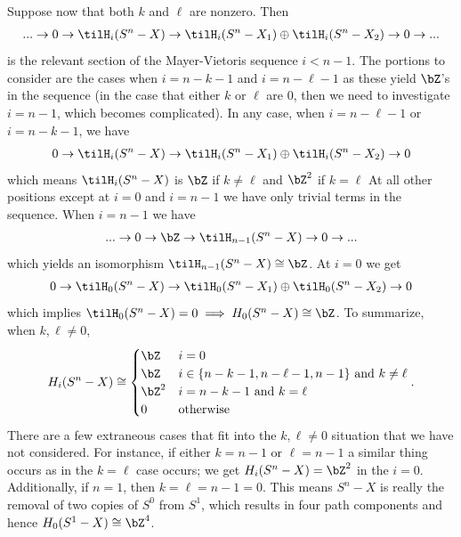 \begin{homework}[e]
\begin{prf}
    Suppose now that both $k$ and $\ell$ are nonzero. Then
    \begin{align*}
      ... \to 0 \to \tilH_i(S^n - X) \to \tilH_i(S^n - X_1) \oplus \tilH_i(S^n - X_2) \to 0 \to ...
    \end{align*}
    is the relevant section of the Mayer-Vietoris sequence $i < n - 1$. The portions to consider are the cases when $i = n - k - 1$ and $i = n - \ell - 1$ as these yield $\bZ$'s in the sequence (in the case that either $k$ or $\ell$ are $0$, then we need to investigate $i = n - 1$, which becomes complicated). In any case, when $i = n - \ell - 1$ or $i = n - k - 1$, we have
    \begin{align*}
      0 \to \tilH_i(S^n - X) \to \tilH_i(S^n - X_1) \oplus \tilH_i(S^n - X_2) \to 0
    \end{align*}
    which means $\tilH_i(S^n - X)$ is $\bZ$ if $k \neq \ell$ and $\bZ^2$ if $k = \ell$
    At all other positions except at $i = 0$ and $i = n-1$ we have only trivial terms in the sequence. When $i = n-1$ we have
    \begin{align*}
      ... \to 0 \to \bZ \to \tilH_{n-1}(S^n - X) \to 0 \to ...
    \end{align*}
    which yields an isomorphism $\tilH_{n-1}(S^n - X) \cong \bZ$. At $i = 0$ we get
    \begin{align*}
      0 \to \tilH_0(S^n - X) \to \tilH_0(S^n - X_1) \oplus \tilH_0(S^n - X_2) \to 0
    \end{align*}
    which implies $\tilH_0(S^n - X) = 0\implies H_0(S^n - X)\cong \bZ$. To summarize, when $k,\ell \neq 0$,
    \begin{align*}
      H_i(S^n - X) \cong
      \begin{cases}
        \bZ & i = 0 \\
        \bZ & i \in \{n- k - 1, n - \ell - 1, n-1\} \text{ and } k\neq \ell\\
        \bZ^2 & i = n - k - 1 \text{ and } k = \ell \\
        0 & \text{otherwise}
      \end{cases}.
    \end{align*}
    There are a few extraneous cases that fit into the $k, \ell \neq 0$ situation that we have not considered. For instance, if either $k = n - 1$ or $\ell = n-1$ a similar thing occurs as in the $k = \ell$ case occurs; we get $H_i(S^n - X) = \bZ^2$ in the $i = 0$. Additionally, if $n = 1$, then $k = \ell = n - 1 = 0$. This means $S^n - X$ is really the removal of two copies of $S^0$ from $S^1$, which results in four path components and hence $H_0(S^1 - X) \cong \bZ^4$.


\end{prf}
\end{homework}
